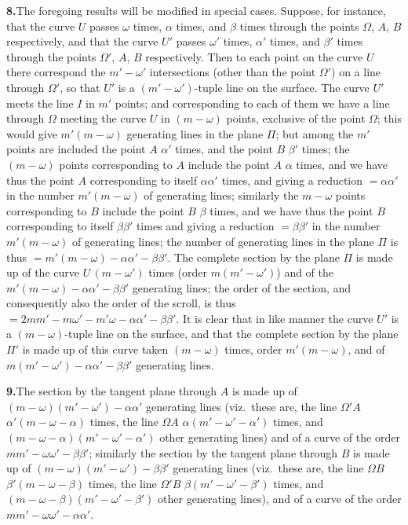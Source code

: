 \documentclass[11pt,a4paper]{article}
\begin{document}
\textbf{8.}\quad The foregoing results will be modified in special cases.
Suppose, for instance, that the curve $U$ passes $\omega$ times, $\alpha$
times, and $\beta$ times through the points $\Omega$, $A$, $B$ respectively,
and that the curve $U'$ passes $\omega'$ times, $\alpha'$ times, and $\beta'$
times through the points $\Omega'$, $A$, $B$ respectively. Then to each point
on the curve $U$ there correspond the $m' - \omega'$ intersections (other than
the point $\Omega'$) on a line through $\Omega'$, so that $U'$ is a
$(m' - \omega')$-tuple line on the surface. The curve $U'$ meets the line $I$
in $m'$ points; and corresponding to each of them we have a line through
$\Omega$ meeting the curve $U$ in $(m - \omega)$ points, exclusive of the
point $\Omega$; this would give $m'(m - \omega)$ generating lines in the
plane $\Pi$; but among the $m'$ points are included the point $A$ $\alpha'$
times, and the point $B$ $\beta'$ times; the $(m - \omega)$ points
corresponding to $A$ include the point $A$ $\alpha$ times, and we have thus
the point $A$ corresponding to itself $\alpha\alpha'$ times, and giving a
reduction $= \alpha\alpha'$ in the number $m'(m - \omega)$ of generating
lines; similarly the $m - \omega$ points corresponding to $B$ include the
point $B$ $\beta$ times, and we have thus the point $B$ corresponding to
itself $\beta\beta'$ times and giving a reduction $= \beta\beta'$ in the
number $m'(m - \omega)$ of generating lines; the number of generating lines
in the plane $\Pi$ is thus $= m'(m - \omega) - \alpha\alpha' - \beta\beta'$.
The complete section by the plane $\Pi$ is made up of the curve
$U\,(m - \omega')$ times (order $m(m' - \omega')$) and of the
$m'(m - \omega) - \alpha\alpha' - \beta\beta'$ generating lines; the order of
the section, and consequently also the order of the scroll, is thus
$= 2 m m' - m\omega' - m'\omega - \alpha\alpha' - \beta\beta'$.
It is clear that in like manner the curve $U'$ is a $(m - \omega)$-tuple line
on the surface, and that the complete section by the plane $\Pi'$ is made up
of this curve taken $(m - \omega)$ times, order $m'(m - \omega)$, and of
$m(m' - \omega') - \alpha\alpha' - \beta\beta'$ generating lines.

\textbf{9.}\quad The section by the tangent plane through $A$ is made up of
$(m - \omega)(m' - \omega') - \alpha\alpha'$ generating lines (viz.\ these are,
the line $\Omega'\!A$ $\alpha'(m - \omega - \alpha)$ times, the line
$\Omega A$ $\alpha(m' - \omega' - \alpha')$ times, and
$(m - \omega - \alpha)(m' - \omega' - \alpha')$ other generating lines) and of
a curve of the order $m m' - \omega\omega' - \beta\beta'$; similarly the
section by the tangent plane through $B$ is made up of
$(m - \omega)(m' - \omega') - \beta\beta'$ generating lines (viz.\ these are,
the line $\Omega B$ $\beta'(m - \omega - \beta)$ times, the line
$\Omega'\!B$ $\beta(m' - \omega' - \beta')$ times, and
$(m - \omega - \beta)(m' - \omega' - \beta')$ other generating lines), and of
a curve of the order $m m' - \omega\omega' - \alpha\alpha'$.
\end{document}
